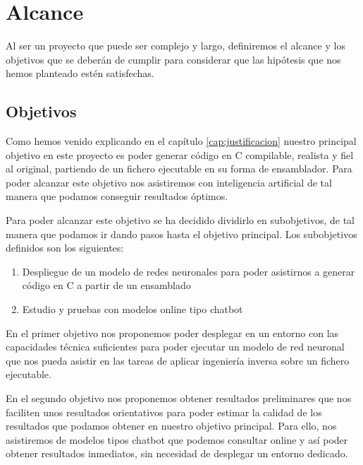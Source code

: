 \chapter{Alcance}
\label{cap:alcance}


Al ser un proyecto que puede ser complejo y largo, definiremos el alcance y los objetivos que se deberán de cumplir para considerar que las hipótesis que nos
hemos planteado estén satisfechas.

\section{Objetivos}
\label{sec:objetivos}


Como hemos venido explicando en el capítulo \ref{cap:justificacion} nuestro principal objetivo en este proyecto es poder generar código en C compilable, realista y fiel
al original, partiendo de un fichero ejecutable en su forma de ensamblador. Para poder alcanzar este objetivo nos asistiremos con inteligencia artificial de tal manera
que podamos conseguir resultados óptimos.

Para poder alcanzar este objetivo se ha decidido dividirlo en subobjetivos, de tal manera que podamos ir dando pasos hasta el objetivo principal.
Los subobjetivos definidos son los siguientes:

\begin{enumerate}
    \item Despliegue de un modelo de redes neuronales para poder asistirnos a generar código en C a partir de un ensamblado
    \item Estudio y pruebas con modelos online tipo chatbot
\end{enumerate}

En el primer objetivo nos proponemos poder desplegar en un entorno con las capacidades técnica suficientes para poder ejecutar un modelo de red neuronal que nos
pueda asistir en las tareas de aplicar ingeniería inversa sobre un fichero ejecutable.

En el segundo objetivo nos proponemos obtener resultados preliminares que nos faciliten unos resultados orientativos para poder estimar la calidad de los resultados que podamos
obtener en nuestro objetivo principal. Para ello, nos asistiremos de modelos tipos chatbot que podemos consultar online y así poder obtener resultados inmediatos, sin necesidad
de desplegar un entorno dedicado.

